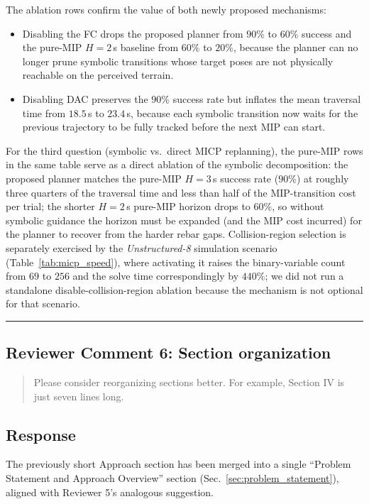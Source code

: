 \noindent The ablation rows confirm the value of both newly proposed mechanisms:
\begin{itemize}
    \item Disabling the FC drops the proposed planner from $90\%$ to $60\%$ success and the pure-MIP $H{=}2$\,s baseline from $60\%$ to $20\%$, because the planner can no longer prune symbolic transitions whose target poses are not physically reachable on the perceived terrain.
    \item Disabling DAC preserves the $90\%$ success rate but inflates the mean traversal time from $18.5$\,s to $23.4$\,s, because each symbolic transition now waits for the previous trajectory to be fully tracked before the next MIP can start.
\end{itemize}
For the third question (symbolic vs.\ direct MICP replanning), the pure-MIP rows in the same table serve as a direct ablation of the symbolic decomposition: the proposed planner matches the pure-MIP $H{=}3$\,s success rate ($90\%$) at roughly three quarters of the traversal time and less than half of the MIP-transition cost per trial; the shorter $H{=}2$\,s pure-MIP horizon drops to $60\%$, so without symbolic guidance the horizon must be expanded (and the MIP cost incurred) for the planner to recover from the harder rebar gaps. Collision-region selection is separately exercised by the \textit{Unstructured-8} simulation scenario (Table~\ref{tab:micp_speed}), where activating it raises the binary-variable count from $69$ to $256$ and the solve time correspondingly by $440\%$; we did not run a standalone disable-collision-region ablation because the mechanism is not optional for that scenario.

\noindent\rule{17cm}{2.0pt}

\subsection{Reviewer Comment 6: Section organization}
\begin{mdframed}
\begin{quote}
Please consider reorganizing sections better. For example, Section IV is just seven lines long.
\end{quote}
\end{mdframed}

\subsection{Response}
The previously short Approach section has been merged into a single ``Problem Statement and Approach Overview'' section (Sec.~\ref{sec:problem_statement}), aligned with Reviewer 5's analogous suggestion.

